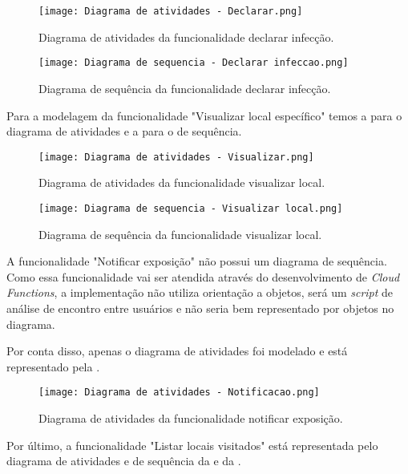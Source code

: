 \begin{figure}[!htb]
  \centering
  \texttt{[image: Diagrama de atividades - Declarar.png]}
  \caption{Diagrama de atividades da funcionalidade declarar infecção.}
  \label{fig:atividadedeclarar}
\end{figure}

\begin{figure}[!htb]
  \centering
  \texttt{[image: Diagrama de sequencia - Declarar infeccao.png]}
  \caption{Diagrama de sequência da funcionalidade declarar infecção.}
  \label{fig:sequenciadeclarar}
\end{figure}

Para a modelagem da funcionalidade "Visualizar local específico" temos a  para o diagrama de atividades e a  para o de sequência.

\begin{figure}[!htb]
  \centering
  \texttt{[image: Diagrama de atividades - Visualizar.png]}
  \caption{Diagrama de atividades da funcionalidade visualizar local.}
  \label{fig:atividadevisualizar}
\end{figure}

\begin{figure}[!htb]
  \centering
  \texttt{[image: Diagrama de sequencia - Visualizar local.png]}
  \caption{Diagrama de sequência da funcionalidade visualizar local.}
  \label{fig:sequenciavisualizar}
\end{figure}

A funcionalidade "Notificar exposição" não possui um diagrama de sequência. Como essa funcionalidade vai ser atendida através do desenvolvimento de \textit{Cloud Functions}, a implementação não utiliza orientação a objetos, será um \textit{script} de análise de encontro entre usuários e não seria bem representado por objetos no diagrama.

Por conta disso, apenas o diagrama de atividades foi modelado e está representado pela .

\begin{figure}[!htb]
  \centering
  \texttt{[image: Diagrama de atividades - Notificacao.png]}
  \caption{Diagrama de atividades da funcionalidade notificar exposição.}
  \label{fig:atividadenotificar}
\end{figure}

Por último, a funcionalidade "Listar locais visitados" está representada pelo diagrama de atividades e de sequência da  e da .

